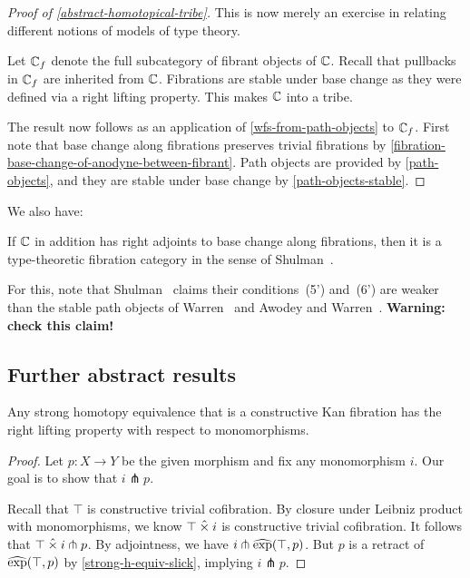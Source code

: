 \documentclass[reqno,10pt,a4paper,oneside]{amsart}
\begin{document}
\begin{proof}[Proof of \cref{abstract-homotopical-tribe}]
This is now merely an exercise in relating different notions of models of type theory.

Let $\mathbb{C}_f$ denote the full subcategory of fibrant objects of $\mathbb{C}$.
Recall that pullbacks in $\mathbb{C}_f$ are inherited from $\mathbb{C}$.
Fibrations are stable under base change as they were defined via a right lifting property.
This makes $\mathbb{C}$ into a tribe.

The result now follows as an application of \cref{wfs-from-path-objects} to $\mathbb{C}_f$.
First note that base change along fibrations preserves trivial fibrations by \cref{fibration-base-change-of-anodyne-between-fibrant}.
Path objects are provided by \cref{path-objects}, and they are stable under base change by \cref{path-objects-stable}.
\end{proof}

We also have:

\begin{theorem}
If $\mathbb{C}$ in addition has right adjoints to base change along fibrations, then it is a type-theoretic fibration category in the sense of Shulman~\cite{shulman:inverse-diagrams}.
\end{theorem}

For this, note that Shulman~\cite{shulman:inverse-diagrams} claims their conditions~(5') and~(6') are weaker than the stable path objects of Warren~\cite{warren:thesis} and Awodey and Warren~\cite{awodey-warren:homotopy-idtype}.
\textbf{Warning: check this claim!}

\subsection{Further abstract results}

\begin{lemma}
Any strong homotopy equivalence that is a constructive Kan fibration has the right lifting property with respect to monomorphisms.
\end{lemma}

\begin{proof}
\label{strong-h-equiv-kan-is-trivial}
Let $p : X \to Y$ be the given morphism and fix any monomorphism $i$.
Our goal is to show that $i \pitchfork p$.

Recall that $\top$ is constructive trivial cofibration.
By closure under Leibniz product with monomorphisms, we know $\top \mathbin{\hat{\times}} i$ is constructive trivial cofibration.
It follows that $\top \mathbin{\hat{\times}} i \pitchfork p$.
By adjointness, we have $i \pitchfork \operatorname{\widehat{exp}}(\top, p)$.
But $p$ is a retract of $\operatorname{\widehat{exp}}(\top, p)$ by \cref{strong-h-equiv-slick}, implying $i \pitchfork p$.
\end{proof}
\end{document}
